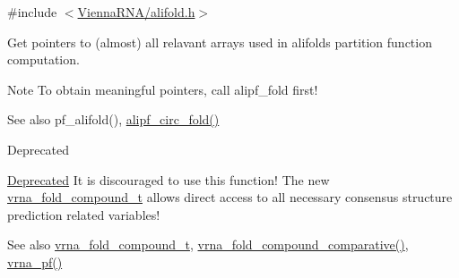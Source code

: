{\ttfamily \#include $<$\mbox{\hyperlink{alifold_8h}{Vienna\+R\+N\+A/alifold.\+h}}$>$}



Get pointers to (almost) all relavant arrays used in alifold\textquotesingle{}s partition function computation. 

\begin{DoxyNote}{Note}
To obtain meaningful pointers, call alipf\+\_\+fold first!
\end{DoxyNote}
\begin{DoxySeeAlso}{See also}
pf\+\_\+alifold(), \mbox{\hyperlink{group__part__func__global__deprecated_ga604a42ad64178279551ad3e4def3d603}{alipf\+\_\+circ\+\_\+fold()}}
\end{DoxySeeAlso}
\begin{DoxyRefDesc}{Deprecated}
\item[\mbox{\hyperlink{deprecated__deprecated000024}{Deprecated}}]It is discouraged to use this function! The new \mbox{\hyperlink{group__fold__compound_ga1b0cef17fd40466cef5968eaeeff6166}{vrna\+\_\+fold\+\_\+compound\+\_\+t}} allows direct access to all necessary consensus structure prediction related variables!\end{DoxyRefDesc}


\begin{DoxySeeAlso}{See also}
\mbox{\hyperlink{group__fold__compound_ga1b0cef17fd40466cef5968eaeeff6166}{vrna\+\_\+fold\+\_\+compound\+\_\+t}}, \mbox{\hyperlink{group__fold__compound_gad6bacc816af274922b13d947f708aa0c}{vrna\+\_\+fold\+\_\+compound\+\_\+comparative()}}, \mbox{\hyperlink{group__part__func__global_ga29e256d688ad221b78d37f427e0e99bc}{vrna\+\_\+pf()}}
\end{DoxySeeAlso}

